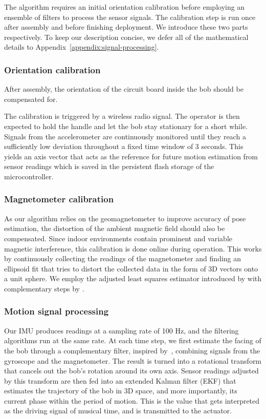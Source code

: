 \documentclass{nime-alternate} %
\begin{document}
The algorithm requires an initial orientation calibration before employing an ensemble of filters to process the sensor signals. The calibration step is run once after assembly and before finishing deployment. We introduce these two parts respectively. To keep our description concise, we defer all of the mathematical details to Appendix~\ref{appendix:signal-processing}.

\subsubsection{Orientation calibration}
After assembly, the orientation of the circuit board inside the bob should be compensated for.

The calibration is triggered by a wireless radio signal. The operator is then expected to hold the handle and let the bob stay stationary for a short while. Signals from the accelerometer are continuously monitored until they reach a sufficiently low deviation throughout a fixed time window of 3 seconds. This yields an axis vector that acts as the reference for future motion estimation from sensor readings which is saved in the persistent flash storage of the microcontroller.

\subsubsection{Magnetometer calibration}
As our algorithm relies on the geomagnetometer to improve accuracy of pose estimation, the distortion of the ambient magnetic field should also be compensated. Since indoor environments contain prominent and variable magnetic interference, this calibration is done online during operation. This works by continuously collecting the readings of the magnetometer and finding an ellipsoid fit that tries to distort the collected data in the form of 3D vectors onto a unit sphere. We employ the adjusted least squares estimator introduced by \cite{Markovsky_2004_ALS} with complementary steps by \cite{Renaudin2010}.

\subsubsection{Motion signal processing}
Our IMU produces readings at a sampling rate of 100 Hz, and the filtering algorithms run at the same rate. At each time step, we first estimate the facing of the bob through a complementary filter, inspired by~\cite{Min_Complementary}, combining signals from the gyroscope and the magnetometer. The result is turned into a rotational transform that cancels out the bob's rotation around its own axis. Sensor readings adjusted by this transform are then fed into an extended Kalman filter (EKF) that estimates the trajectory of the bob in 3D space, and more importantly, its current phase within the period of motion. This is the value that gets interpreted as the driving signal of musical time, and is transmitted to the actuator.
\end{document}
